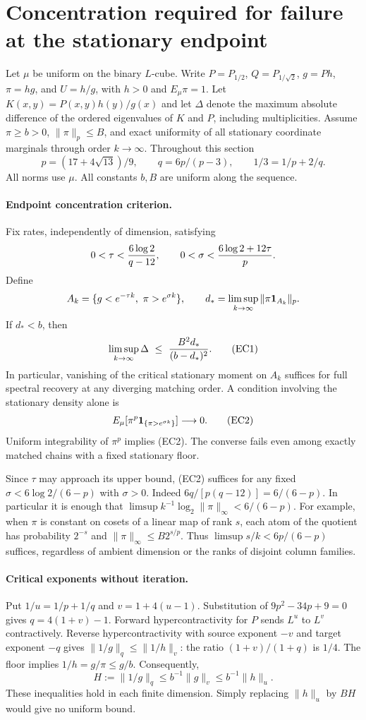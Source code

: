 \section{Concentration required for failure at the stationary endpoint}
\label{sec:endpoint-concentration}

Let $\mu$ be uniform on the binary $L$-cube. Write $P=P_{1/2}$,
$Q=P_{1/\sqrt2}$, $g=Ph$, $\pi=hg$, and $U=h/g$, with $h>0$ and
$E_\mu\pi=1$. Let $K(x,y)=P(x,y)h(y)/g(x)$ and let $\Delta$ denote the
maximum absolute difference of the ordered eigenvalues of $K$ and $P$,
including multiplicities. Assume $\pi\ge b>0$, $\|\pi\|_p\le B$, and exact
uniformity of all stationary coordinate marginals through order $k\to\infty$.
Throughout this section
\[
 p=(17+4\sqrt{13})/9,\qquad q=6p/(p-3),\qquad 1/3=1/p+2/q .
\]
All norms use $\mu$. All constants $b,B$ are uniform along the sequence.

\paragraph{Endpoint concentration criterion.}
Fix rates, independently of dimension, satisfying
\[
 0<\tau<{6\log 2\over q-12},\qquad
 0<\sigma<{6\log 2+12\tau\over p}.
\] Define
\[
 A_k=\{g<e^{-\tau k},\ \pi>e^{\sigma k}\},\qquad
 d_*=\limsup_{k\to\infty}\|\pi{\bf1}_{A_k}\|_p .
\]
If $d_*<b$, then
\[
 \limsup_{k\to\infty}\Delta\ \le\ {B^2 d_*\over (b-d_*)^2}.
 \tag{EC1}
\]
In particular, vanishing of the critical stationary moment on $A_k$
suffices for full spectral recovery at any diverging matching order.
A condition involving the stationary density alone is
\[
 E_\mu[\pi^p{\bf1}_{\{\pi>e^{\sigma k}\}}]\longrightarrow0 .
 \tag{EC2}
\]
Uniform integrability of $\pi^p$ implies (EC2). The converse fails even
among exactly matched chains with a fixed stationary floor.

Since $\tau$ may approach its upper bound, (EC2) suffices for any fixed
$\sigma<6\log 2/(6-p)$ with $\sigma>0$. Indeed
$6q/[p(q-12)]=6/(6-p)$. In particular it is enough that
$\limsup k^{-1}\log_2\|\pi\|_\infty<6/(6-p)$.
For example, when $\pi$ is constant on cosets of a linear map of rank $s$,
each atom of the quotient has probability $2^{-s}$ and
$\|\pi\|_\infty\le B2^{s/p}$. Thus $\limsup s/k<6p/(6-p)$ suffices,
regardless of ambient dimension or the ranks of disjoint column families.

\paragraph{Critical exponents without iteration.}
Put $1/u=1/p+1/q$ and $v=1+4(u-1)$. Substitution of
$9p^2-34p+9=0$ gives $q=4(1+v)-1$.
Forward hypercontractivity for $P$ sends $L^u$ to $L^v$ contractively.
Reverse hypercontractivity with source exponent $-v$ and target exponent
$-q$ gives $\|1/g\|_q\le\|1/h\|_v$: the ratio $(1+v)/(1+q)$ is $1/4$.
The floor implies $1/h=g/\pi\le g/b$. Consequently,
\[
 H:=\|1/g\|_q\le b^{-1}\|g\|_v\le b^{-1}\|h\|_u .
 \tag{EC3}
\]
These inequalities hold in each finite dimension. Simply replacing
$\|h\|_u$ by $BH$ would give no uniform bound.

